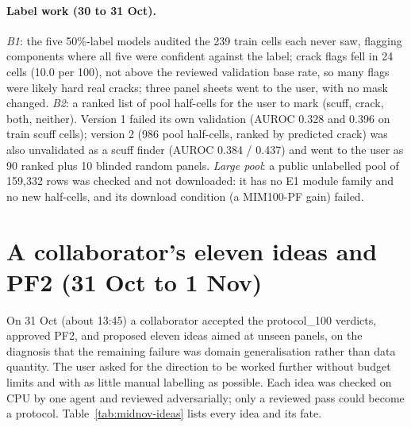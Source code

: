 \paragraph{Label work (30 to 31 Oct).} \emph{B1}: the five 50\%-label models audited the 239 train cells each never saw, flagging
components where all five were confident against the label; crack flags fell in 24 cells (10.0 per 100), not above the reviewed
validation base rate, so many flags were likely hard real cracks; three panel sheets went to the user, with no mask changed.
\emph{B2}: a ranked list of pool half-cells for the user to mark (scuff, crack, both, neither). Version 1 failed its own validation
(AUROC 0.328 and 0.396 on train scuff cells); version 2 (986 pool half-cells, ranked by predicted crack) was also unvalidated as a
scuff finder (AUROC 0.384 / 0.437) and went to the user as 90 ranked plus 10 blinded random panels. \emph{Large pool}: a public
unlabelled pool of 159,332 rows was checked and not downloaded: it has no E1 module family and no new half-cells, and its download
condition (a MIM100-PF gain) failed.

\section{A collaborator's eleven ideas and PF2 (31 Oct to 1 Nov)}\label{sec:midnov-ideas}

On 31 Oct (about 13:45) a collaborator accepted the protocol\_100 verdicts, approved PF2, and proposed eleven ideas aimed at unseen
panels, on the diagnosis that the remaining failure was domain generalisation rather than data quantity. The user asked for the
direction to be worked further without budget limits and with as little manual labelling as possible. Each idea was checked on CPU
by one agent and reviewed adversarially; only a reviewed pass could become a protocol. Table~\ref{tab:midnov-ideas} lists every idea
and its fate.

